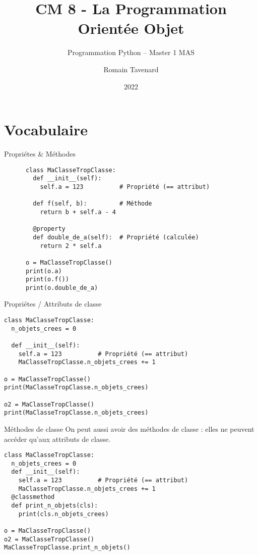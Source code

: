 \documentclass[10pt]{beamer}
\title[M1 MAS -- Python -- POO]{CM 8 - La Programmation Orientée Objet}
\subtitle{Programmation Python -- Master 1 MAS}
\author{Romain Tavenard}
\date{2022}
\institute{%
\hypersetup{urlcolor=.}
\makebox[2.2ex][c]{\faEnvelope}\enspace\href{mailto:romain.tavenard@univ-rennes2.fr}{\texttt{romain.tavenard@univ-rennes2.fr}}\\%
}
\begin{document}
\maketitle

\section{Vocabulaire}

\begin{frame}[fragile]{Propriétes \& Méthodes}
  \begin{beamercodeblock}
    \begin{verbatim}
      class MaClasseTropClasse:
        def __init__(self):
          self.a = 123          # Propriété (== attribut)
        
        def f(self, b):         # Méthode
          return b + self.a - 4

        @property
        def double_de_a(self):  # Propriété (calculée)
          return 2 * self.a

      o = MaClasseTropClasse()
      print(o.a)
      print(o.f())
      print(o.double_de_a)
    \end{verbatim}
  \end{beamercodeblock}
\end{frame}

\begin{frame}[fragile]{Propriétes / Attributs de classe}
  \begin{beamercodeblock}
    \begin{verbatim}
class MaClasseTropClasse:
  n_objets_crees = 0

  def __init__(self):
    self.a = 123          # Propriété (== attribut)
    MaClasseTropClasse.n_objets_crees += 1

o = MaClasseTropClasse()
print(MaClasseTropClasse.n_objets_crees)

o2 = MaClasseTropClasse()
print(MaClasseTropClasse.n_objets_crees)
    \end{verbatim}
  \end{beamercodeblock}
\end{frame}

\begin{frame}[fragile]{Méthodes de classe}
  On peut aussi avoir des méthodes de classe : elles ne peuvent accéder qu'aux attributs de classe.

  \begin{beamercodeblock}
    \begin{verbatim}
class MaClasseTropClasse:
  n_objets_crees = 0
  def __init__(self):
    self.a = 123          # Propriété (== attribut)
    MaClasseTropClasse.n_objets_crees += 1
  @classmethod
  def print_n_objets(cls):
    print(cls.n_objets_crees)

o = MaClasseTropClasse()
o2 = MaClasseTropClasse()
MaClasseTropClasse.print_n_objets()
    \end{verbatim}
  \end{beamercodeblock}
\end{frame}
\end{document}
